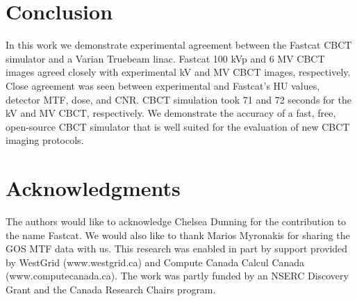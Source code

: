 \section{Conclusion}

In this work we demonstrate experimental agreement between the Fastcat CBCT simulator and a Varian Truebeam linac. Fastcat 100 kVp and 6 MV CBCT images agreed closely with experimental kV and MV CBCT images, respectively. Close agreement was seen between experimental and Fastcat’s HU values, detector MTF, dose, and CNR.  CBCT simulation took 71 and 72 seconds for the kV and MV CBCT, respectively. We demonstrate the accuracy of a fast, free, open-source CBCT simulator that is well suited for the evaluation of new CBCT imaging protocols.

\section{Acknowledgments}

The authors would like to acknowledge Chelsea Dunning for the contribution to the name Fastcat. We would also like to thank Marios Myronakis for sharing the GOS MTF data with us. This research was enabled in part by support provided by WestGrid (www.westgrid.ca) and Compute Canada Calcul Canada (www.computecanada.ca). The work was partly funded by an NSERC Discovery Grant and the Canada Research Chairs program. 




